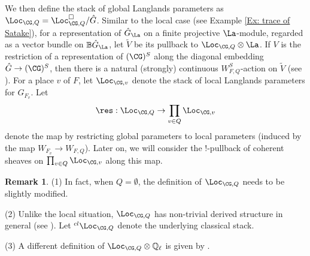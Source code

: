 \documentclass[11pt]{amsart}
\theoremstyle{definition}
\theoremstyle{definition}
\newtheorem{rmk}[thm]{Remark}
\theoremstyle{definition}
\numberwithin{equation}{section}
\newcommand{\bB}{{\mathbb B}}
\newcommand{\bQ}{{\mathbb Q}}
\begin{document}
We then define the stack of global Langlands parameters as $\Loc_{\CG,Q}=\Loc_{\CG,Q}^\Box/\hat{G}$. Similar to the local case (see Example \ref{Ex: trace of Satake}),
for a representation of $\hat{G}_\La$ on a finite projective $\La$-module, regarded as a vector bundle on $\bB\hat{G}_\La$, let $\widetilde V$ be its pullback to $\Loc_{\CG,Q}\otimes\La$. If $V$ is the restriction of a representation of $(\CG)^S$ along the diagonal embedding $\hat{G}\to (\CG)^S$, then there is a natural (strongly) continuous $W_{F,Q}^S$-action on $\widetilde V$ (see \cite[Sect. 2.4]{Zhu-Conjecture}). For a place $v$ of $F$, let $\Loc_{\CG,v}$ denote the stack of local Langlands parameters for $G_{F_v}$. Let
\[
\res: \Loc_{\CG,Q}\to \prod_{v\in Q}\Loc_{\CG,v}
\] 
denote the map by restricting global parameters to local parameters (induced by the map $W_{F_v}\to W_{F,Q}$). Later on, we will consider the $!$-pullback of coherent sheaves on $ \prod_{v\in Q}\Loc_{\CG,v}$ along this map.
\begin{rmk}
(1) In fact, when $Q=\emptyset$, the definition of $\Loc_{\CG,Q}$ needs to be slightly modified. 

(2) Unlike the local situation, $\Loc_{\CG,Q}$ has non-trivial derived structure in general (see \cite[Rem. 3.4.5]{Zhu-Conjecture}). Let ${}^{cl}\Loc_{\CG,Q}$ denote the underlying classical stack.

(3) A different definition of $\Loc_{\CG,Q}\otimes\bQ_\ell$ is given by \cite{AGKRRV}.
\end{rmk}
\end{document}
